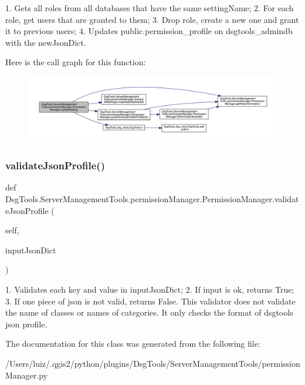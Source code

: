 \begin{DoxyVerb}1. Gets all roles from all databases that have the same settingName;
2. For each role, get users that are granted to them;
3. Drop role, create a new one and grant it to previous users;
4. Updates public.permission_profile on dsgtools_admindb with the newJsonDict.
\end{DoxyVerb}
 Here is the call graph for this function\+:
\nopagebreak
\begin{figure}[H]
\begin{center}
\leavevmode
\includegraphics[width=350pt]{class_dsg_tools_1_1_server_management_tools_1_1permission_manager_1_1_permission_manager_a26e0604c4107fc31713534e7a939de30_cgraph}
\end{center}
\end{figure}
\mbox{\label{class_dsg_tools_1_1_server_management_tools_1_1permission_manager_1_1_permission_manager_adcea6c57b219fa85a4e0c3ffa648c1ec}} 
\subsubsection{\texorpdfstring{validate\+Json\+Profile()}{validateJsonProfile()}}
{\footnotesize\ttfamily def Dsg\+Tools.\+Server\+Management\+Tools.\+permission\+Manager.\+Permission\+Manager.\+validate\+Json\+Profile (\begin{DoxyParamCaption}\item[{}]{self,  }\item[{}]{input\+Json\+Dict }\end{DoxyParamCaption})}

\begin{DoxyVerb}1. Validates each key and value in inputJsonDict;
2. If input is ok, returns True;
3. If one piece of json is not valid, returns False.
This validator does not validate the name of classes or names of categories. It only checks the format of dsgtools json profile.
\end{DoxyVerb}
 

The documentation for this class was generated from the following file\+:\begin{DoxyCompactItemize}
\item 
/\+Users/luiz/.\+qgis2/python/plugins/\+Dsg\+Tools/\+Server\+Management\+Tools/permission\+Manager.\+py\end{DoxyCompactItemize}
